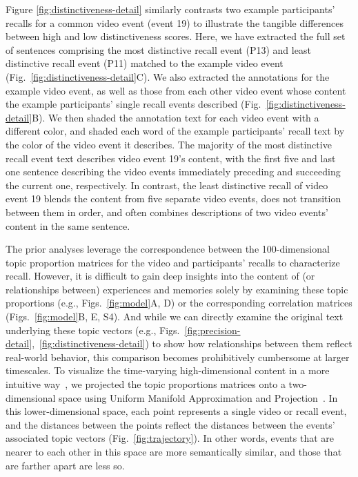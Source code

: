 \documentclass{article}
\newcommand{\corrmats}{S4}
\begin{document}
Figure \ref{fig:distinctiveness-detail} similarly contrasts two example participants' recalls for a common video event (event 19) to illustrate the tangible differences between high and low distinctiveness scores.  Here, we have extracted the full set of sentences comprising the most distinctive recall event (P13) and least distinctive recall event (P11) matched to the example video event (Fig.~\ref{fig:distinctiveness-detail}C).  We also extracted the annotations for the example video event, as well as those from each other video event whose content the example participants' single recall events described (Fig.~\ref{fig:distinctiveness-detail}B).  We then shaded the annotation text for each video event with a different color, and shaded each word of the example participants' recall text by the color of the video event it describes.  The majority of the most distinctive recall event text describes video event 19's content, with the first five and last one sentence describing the video events immediately preceding and succeeding the current one, respectively.  In contrast, the least distinctive recall of video event 19 blends the content from five separate video events, does not transition between them in order, and often combines descriptions of two video events' content in the same sentence.

The prior analyses leverage the correspondence between the 100-dimensional topic proportion matrices for the video and participants' recalls to characterize recall.  However, it is difficult to gain deep insights into the content of (or relationships between) experiences and memories solely by examining these topic proportions (e.g., Figs.~\ref{fig:model}A, D) or the corresponding correlation matrices (Figs.~\ref{fig:model}B, E, \corrmats).  And while we can directly examine the original text underlying these topic vectors (e.g., Figs.~\ref{fig:precision-detail},~\ref{fig:distinctiveness-detail}) to show how relationships between them reflect real-world behavior, this comparison becomes prohibitively cumbersome at larger timescales.  To visualize the time-varying high-dimensional content in a more intuitive way~\citep{HeusEtal18a}, we projected the topic proportions matrices onto a two-dimensional space using Uniform Manifold Approximation and Projection~\citep[UMAP; ][]{McInEtal18}.  In this lower-dimensional space, each point represents a single video or recall event, and the distances between the points reflect the distances between the events' associated topic vectors (Fig.~\ref{fig:trajectory}). In other words, events that are nearer to each other in this space are more semantically similar, and those that are farther apart are less so.
\end{document}
